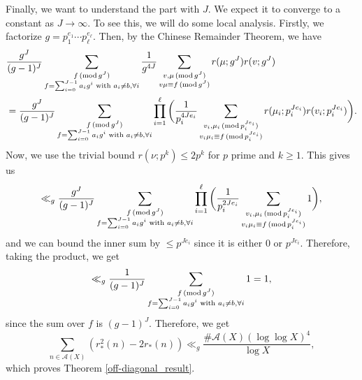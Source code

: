 \documentclass[12pt]{amsart}
\theoremstyle{definition}
\theoremstyle{definition}
\theoremstyle{remark}
\numberwithin{equation}{section}
\newcommand{\CA}{\mathcal{A}}
\renewcommand{\geq}{\geqslant}
\renewcommand{\leq}{\leqslant}
\renewcommand{\mod}[1]{\,({\rm mod}\,#1)}
\begin{document}
Finally, we want to understand the part with $J$. We expect it to converge to a constant as $J\to\infty$. To see this, we will do some local analysis. Firstly, we factorize $g=p_1^{e_1}\cdots p_{\ell}^{e_{\ell}}$. Then, by the Chinese Remainder Theorem, we have
\begin{align*}
&\frac{g^J}{(g-1)^J} \sum_{\substack{f \mod{g^J} \\ f = \sum_{i=0}^{J-1}a_ig^i \text{ with } a_i\not=b, \forall i}} \frac{1}{g^{4J}} \sum_{\substack{v , \mu\mod{g^J} \\ v\mu\equiv f \mod{g^J}}} r(\mu ; g^J) r(v ; g^J) \\
&=  \frac{g^J}{(g-1)^J} \sum_{\substack{f \mod{g^J} \\ f = \sum_{i=0}^{J-1}a_ig^i \text{ with } a_i\not=b, \forall i}} \prod_{i=1}^{\ell} \bigg( \frac{1}{p_i^{4Je_i}} \sum_{\substack{v_i,\mu_i \mod{p_i^{Je_i}} \\ v_i \mu_i \equiv f \mod{p_i^{Je_i}}}} r(\mu_i ; p_i^{Je_i}) r(v_i ; p_i^{Je_i})  \bigg) .
\end{align*}
Now, we use the trivial bound $r(\nu;p^k) \leq 2 p^k$ for $p$ prime and $k\geq 1$. This gives us
$$ \ll_g  \frac{g^J}{(g-1)^J} \sum_{\substack{f \mod{g^J} \\ f = \sum_{i=0}^{J-1}a_ig^i \text{ with } a_i\not=b, \forall i}} \prod_{i=1}^{\ell} \bigg( \frac{1}{p_i^{2Je_i}} \sum_{\substack{v_i,\mu_i \mod{p_i^{Je_i}} \\ v_i \mu_i \equiv f \mod{p_i^{Je_i}}}} 1 \bigg), $$
and we can bound the inner sum by $\leq p^{Je_i}$ since it is either $0$ or $p^{Je_i}$. Therefore, taking the product, we get
$$ \ll_g  \frac{1}{(g-1)^J} \sum_{\substack{f \mod{g^J} \\ f = \sum_{i=0}^{J-1}a_ig^i \text{ with } a_i\not=b, \forall i}} 1 = 1,  $$
since the sum over $f$ is $(g-1)^J$.
Therefore, we get
$$ \sum_{n\in \CA(X)} (r_*^2(n) - 2 r_*(n)) \ll_g \frac{\#\CA(X)(\log\log X)^4}{\log X} , $$
which proves Theorem \ref{off-diagonal_result}.




\nocite{*}


\end{document}
